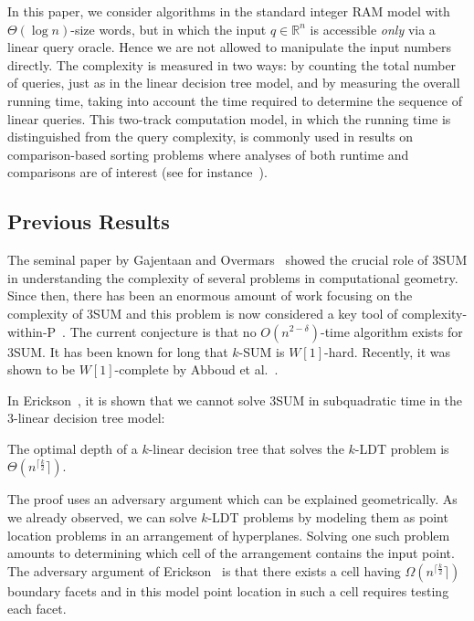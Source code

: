 In this paper, we consider algorithms in the standard integer RAM model with
$\Theta(\log n)$-size words, but in which the input $q\in\mathbb{R}^n$ is
accessible \emph{only} via a linear query oracle. Hence we are not allowed to
manipulate the input numbers directly. The complexity is measured in two ways:
by counting the total number of queries, just as in the linear decision tree
model, and by measuring the overall running time, taking into account the time
required to determine the sequence of linear queries. This two-track
computation model, in which the running time is distinguished from the query
complexity, is commonly used in results on comparison-based sorting problems
where analyses of both runtime and comparisons are of interest (see for
instance~\cite{SS95,CFJJM10,CFJJM13}).

\subsection{Previous Results}
The seminal paper by Gajentaan and Overmars~\cite{GO95} showed the crucial role
of 3SUM in understanding the complexity of several problems in
computational geometry.
Since then, there has been an enormous amount of work focusing on the complexity of
3SUM and this problem is now considered a key tool of
complexity-within-P~\cite{GO95,BH99,MO01,BDP08,P10,ACLL14,AVW14,GP14,KPP14,ALW14,AWY15,CL15}.
The current conjecture is that no $O(n^{2-\delta})$-time algorithm exists for 3SUM.
It has been known for long that \(k\)-SUM is $W[1]$-hard. Recently, it was shown
to be $W[1]$-complete by Abboud et al.~\cite{ALW14}.

In Erickson~\cite{E99}, it is shown that we cannot solve 3SUM in
subquadratic time in the \(3\)-linear decision tree model:
\begin{theorem}
The optimal depth of a \(k\)-linear decision tree that solves
the \(k\)-LDT problem is $\Theta(n^{\lceil\frac{k}{2}}\rceil)$.
\end{theorem}
The proof uses an adversary argument which can be explained geometrically. As
we already observed, we can solve \(k\)-LDT problems by modeling them as point
location problems in an arrangement of hyperplanes. Solving one such problem
amounts to determining which cell of the arrangement contains the input point.
The adversary argument of Erickson~\cite{E99} is that there exists a cell having
$\Omega(n^{\lceil\frac{k}{2}}\rceil)$ boundary facets and in this model point
location in such a cell requires testing each facet.

